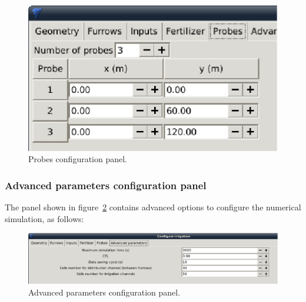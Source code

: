 \documentclass[review,authoryear]{elsarticle}
\begin{document}
\begin{figure}[!ht]
\begin{center}
\includegraphics[width=366\UNIT]{confSondasEN-2.eps}
\caption{Probes configuration panel.}\label{sondas}
\end{center}
\end{figure}

\subsubsection{Advanced parameters configuration panel}

The panel shown in figure~\ref{param} contains advanced options to configure
the numerical simulation, as follows:

\begin{figure}[!ht]
\begin{center}
\includegraphics[width=923\UNIT]{confParamEN-2.eps}
\caption{Advanced parameters configuration panel.}\label{param}
\end{center}
\end{figure}
\end{document}
